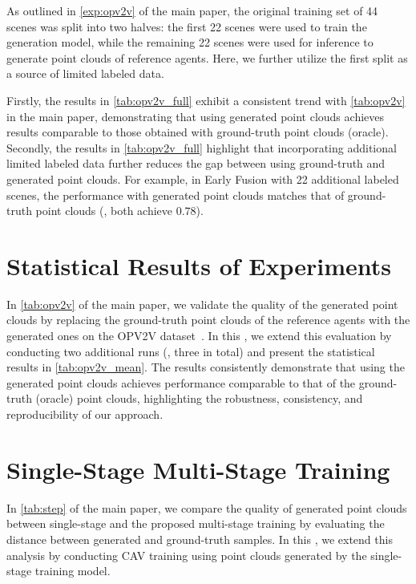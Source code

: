  As outlined in \cref{exp:opv2v} of the main paper, the original training set of 44 scenes was split into two halves: the first 22 scenes were used to train the generation model, while the remaining 22 scenes were used for inference to generate point clouds of reference agents. Here, we further utilize the first split as a source of limited labeled data.  

Firstly, the results in \cref{tab:opv2v_full} exhibit a consistent trend with \cref{tab:opv2v} in the main paper, demonstrating that using generated point clouds achieves results comparable to those obtained with ground-truth point clouds (oracle).
Secondly, the results in \cref{tab:opv2v_full} highlight that incorporating additional limited labeled data further reduces the gap between using ground-truth and generated point clouds. For example, in Early Fusion with 22 additional labeled scenes, the performance with generated point clouds matches that of ground-truth point clouds (\ie, both achieve $0.78$).

\section{Statistical Results of Experiments}
\label{sup:stat}


In \cref{tab:opv2v} of the main paper, we validate the quality of the generated point clouds by replacing the ground-truth point clouds of the reference agents with the generated ones on the OPV2V dataset~\citep{xu2022opv2v}. In this \supp, we extend this evaluation by conducting two additional runs (\ie, three in total) and present the statistical results in \cref{tab:opv2v_mean}. The results consistently demonstrate that using the generated point clouds achieves performance comparable to that of the ground-truth (oracle) point clouds, highlighting the robustness, consistency, and reproducibility of our approach. 


\section{Single-Stage \vs Multi-Stage Training}
\label{sup:stage}
In \cref{tab:step} of the main paper, we compare the quality of generated point clouds between single-stage and the proposed multi-stage training by evaluating the distance between generated and ground-truth samples. In this \supp, we extend this analysis by conducting CAV training using point clouds generated by the single-stage training model. 

